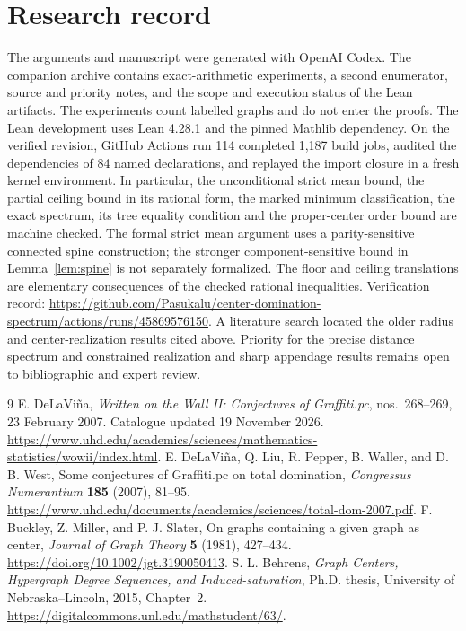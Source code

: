 \documentclass[11pt]{article}
\begin{document}
\section*{Research record}
The arguments and manuscript were generated with OpenAI Codex. The companion
archive contains exact-arithmetic experiments, a second enumerator, source and
priority notes, and the scope and execution status of the Lean artifacts.
The experiments count labelled graphs and do not enter the proofs.
The Lean development uses Lean 4.28.1 and the pinned Mathlib dependency.
On the verified revision, GitHub Actions run 114 completed 1,187 build jobs,
audited the dependencies of 84 named declarations, and replayed the import
closure in a fresh kernel environment. In particular, the unconditional
strict mean bound, the partial ceiling bound in its rational form, the
marked minimum classification, the exact spectrum, its tree equality
condition and the proper-center order bound are machine checked.
The formal strict mean argument uses a parity-sensitive connected spine
construction; the stronger component-sensitive bound in
Lemma~\ref{lem:spine} is not separately formalized. The floor and ceiling
translations are elementary consequences of the checked rational inequalities.
Verification record: \url{https://github.com/Pasukalu/center-domination-spectrum/actions/runs/45869576150}.
A literature search located the older radius and center-realization results
cited above. Priority for the precise distance spectrum and constrained
realization and sharp appendage results remains open to bibliographic and
expert review.
\begin{thebibliography}{9}
 E. DeLaVi\~na, \emph{Written on the Wall II: Conjectures of
Graffiti.pc}, nos.\ 268--269, 23 February 2007. Catalogue updated 19 November
2026. \url{https://www.uhd.edu/academics/sciences/mathematics-statistics/wowii/index.html}.
 E. DeLaVi\~na, Q. Liu, R. Pepper, B. Waller, and D. B. West,
Some conjectures of Graffiti.pc on total domination, \emph{Congressus
Numerantium} \textbf{185} (2007), 81--95.
\url{https://www.uhd.edu/documents/academics/sciences/total-dom-2007.pdf}.
 F. Buckley, Z. Miller, and P. J. Slater, On graphs containing a
given graph as center, \emph{Journal of Graph Theory} \textbf{5} (1981),
427--434. \url{https://doi.org/10.1002/jgt.3190050413}.
 S. L. Behrens, \emph{Graph Centers, Hypergraph Degree
Sequences, and Induced-saturation}, Ph.D. thesis, University of
Nebraska--Lincoln, 2015, Chapter~2.
\url{https://digitalcommons.unl.edu/mathstudent/63/}.
\end{thebibliography}
\end{document}
